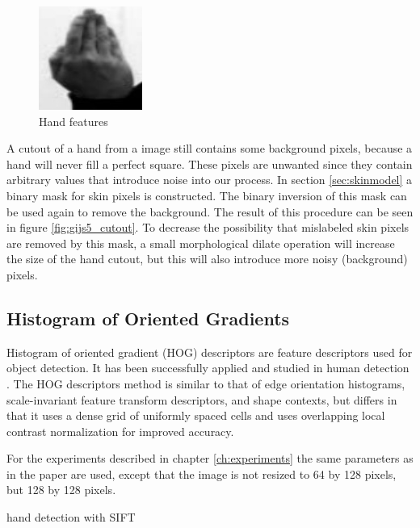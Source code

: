 \begin{figure}
        \center
        \includegraphics[width=0.4\linewidth]{figures/pipeline/lefthandhog.jpg}
        \caption{Hand features}
        \label{fig:lefthandfeatures}
\end{figure}

A cutout of a hand from a image still contains some background pixels, because a hand will never fill a perfect square. These pixels are unwanted since they contain arbitrary values that introduce noise into our process. In section \ref{sec:skinmodel} a binary mask for skin pixels is constructed. The binary inversion of this mask can be used again to remove the background. The result of this procedure can be seen in figure \ref{fig:gijs5_cutout}. To decrease the possibility that mislabeled skin pixels are removed by this mask, a small morphological dilate operation will increase the size of the hand cutout, but this will also introduce more noisy (background) pixels. 


\subsection*{Histogram of Oriented Gradients}
Histogram of oriented gradient (HOG) descriptors are feature descriptors used for object detection. It has been successfully applied and studied in human detection \cite{watanabe2009}.  The HOG descriptors method is similar to that of edge orientation histograms, scale-invariant feature transform descriptors, and shape contexts, but differs in that it uses a dense grid of uniformly spaced cells and uses overlapping local contrast normalization for improved accuracy.

For the experiments described in chapter \ref{ch:experiments} the same parameters as in the \cite{watanabe2009} paper are used, except that the image is not resized to 64 by 128 pixels, but 128 by 128 pixels.

hand detection with SIFT\cite{Wang_handposture}

